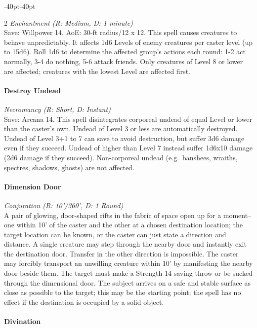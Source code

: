 \documentclass{book}
\begin{document}
\begin{adjustwidth}{-40pt}{-40pt}
\begin{multicols}{2}
\emph{Enchantment (R: Medium, D: 1 minute)}\\
Save: Willpower 14. AoE: 30-ft radius/12 x 12. This spell causes
creatures to behave unpredictably. It affects 1d6 Levels of enemy
creatures per caster level (up to 15d6). Roll 1d6 to determine the
affected group's actions each round: 1-2 act normally, 3-4 do nothing,
5-6 attack friends. Only creatures of Level 8 or lower are affected;
creatures with the lowest Level are affected first.

\paragraph{Destroy Undead}\label{destroy-undead}

\emph{Necromancy (R: Short, D: Instant)}\\
Save: Arcana 14. This spell disintegrates corporeal undead of equal
Level or lower than the caster's own. Undead of Level 3 or less are
automatically destroyed. Undead of Level 3+1 to 7 can save to avoid
destruction, but suffer 3d6 damage even if they succeed. Undead of
higher than Level 7 instead suffer 1d6x10 damage (2d6 damage if they
succeed). Non-corporeal undead (e.g.~banshees, wraiths, spectres,
shadows, ghosts) are not affected.

\paragraph{Dimension Door}\label{dimension-door}

\emph{Conjuration (R: 10'/360', D: 1 Round)}\\
A pair of glowing, door-shaped rifts in the fabric of space open up for
a moment--one within 10' of the caster and the other at a chosen
destination location; the target location can be known, or the caster
can just state a direction and distance. A single creature may step
through the nearby door and instantly exit the destination door.
Transfer in the other direction is impossible. The caster may forcibly
transport an unwilling creature within 10' by manifesting the nearby
door beside them. The target must make a Strength 14 saving throw or be
sucked through the dimensional door. The subject arrives on a safe and
stable surface as close as possible to the target; this may be the
starting point; the spell has no effect if the destination is occupied
by a solid object.

\paragraph{Divination}\label{divination}


\end{multicols}
\end{adjustwidth}
\end{document}
